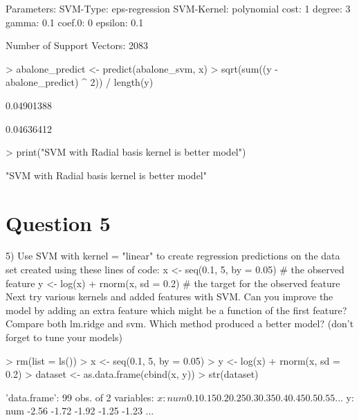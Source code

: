 \documentclass{article}
\begin{document}
\begin{Schunk}
\begin{Soutput}
Parameters:
   SVM-Type:  eps-regression 
 SVM-Kernel:  polynomial 
       cost:  1 
     degree:  3 
      gamma:  0.1 
     coef.0:  0 
    epsilon:  0.1 


Number of Support Vectors:  2083
\end{Soutput}
\begin{Sinput}
> abalone_predict <- predict(abalone_svm, x)
> sqrt(sum((y - abalone_predict) ^ 2)) / length(y)
\end{Sinput}
\begin{Soutput}
[1] 0.04901388
\end{Soutput}
\begin{Soutput}
[1] 0.04636412
\end{Soutput}
\begin{Sinput}
> print("SVM with Radial basis kernel is better model")
\end{Sinput}
\begin{Soutput}
[1] "SVM with Radial basis kernel is better model"
\end{Soutput}
\end{Schunk}

\section*{Question 5}

5) Use SVM with kernel = "linear" to create regression predictions on the data
set created using these lines of code:
x <- seq(0.1, 5, by = 0.05) \# the observed feature
y <- log(x) + rnorm(x, sd = 0.2) \# the target for the observed feature
Next try various kernels and added features with SVM. Can you improve the
model by adding an extra feature which might be a function of the first
feature? Compare both lm.ridge and svm. Which method produced a better
model? (don't forget to tune your models)

\begin{Schunk}
\begin{Sinput}
> rm(list = ls())
> x <- seq(0.1, 5, by = 0.05)
> y <- log(x) + rnorm(x, sd = 0.2)
> dataset <- as.data.frame(cbind(x, y))
> str(dataset)
\end{Sinput}
\begin{Soutput}
'data.frame':	99 obs. of  2 variables:
 $ x: num  0.1 0.15 0.2 0.25 0.3 0.35 0.4 0.45 0.5 0.55 ...
 $ y: num  -2.56 -1.72 -1.92 -1.25 -1.23 ...
\end{Soutput}
\end{Schunk}
\end{document}

